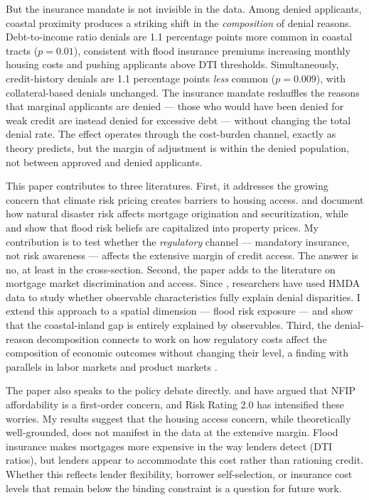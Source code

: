 \documentclass[12pt]{article}
\begin{document}
But the insurance mandate is not invisible in the data. Among denied applicants, coastal proximity produces a striking shift in the \textit{composition} of denial reasons. Debt-to-income ratio denials are 1.1 percentage points more common in coastal tracts ($p = 0.01$), consistent with flood insurance premiums increasing monthly housing costs and pushing applicants above DTI thresholds. Simultaneously, credit-history denials are 1.1 percentage points \textit{less} common ($p = 0.009$), with collateral-based denials unchanged. The insurance mandate reshuffles the reasons that marginal applicants are denied --- those who would have been denied for weak credit are instead denied for excessive debt --- without changing the total denial rate. The effect operates through the cost-burden channel, exactly as theory predicts, but the margin of adjustment is within the denied population, not between approved and denied applicants.

This paper contributes to three literatures. First, it addresses the growing concern that climate risk pricing creates barriers to housing access. \citet{keys2020neglected} and \citet{ouazad2022mortgage} document how natural disaster risk affects mortgage origination and securitization, while \citet{bakkensen2022going} and \citet{baldauf2020does} show that flood risk beliefs are capitalized into property prices. My contribution is to test whether the \textit{regulatory} channel --- mandatory insurance, not risk awareness --- affects the extensive margin of credit access. The answer is no, at least in the cross-section. Second, the paper adds to the literature on mortgage market discrimination and access. Since \citet{munnell1996mortgage}, researchers have used HMDA data to study whether observable characteristics fully explain denial disparities. I extend this approach to a spatial dimension --- flood risk exposure --- and show that the coastal-inland gap is entirely explained by observables. Third, the denial-reason decomposition connects to work on how regulatory costs affect the composition of economic outcomes without changing their level, a finding with parallels in labor markets and product markets \citep{angrist2009mostly}.

The paper also speaks to the policy debate directly. \citet{kousky2018financing} and \citet{kousky2014managing} have argued that NFIP affordability is a first-order concern, and Risk Rating 2.0 has intensified these worries. My results suggest that the housing access concern, while theoretically well-grounded, does not manifest in the data at the extensive margin. Flood insurance makes mortgages more expensive in the way lenders detect (DTI ratios), but lenders appear to accommodate this cost rather than rationing credit. Whether this reflects lender flexibility, borrower self-selection, or insurance cost levels that remain below the binding constraint is a question for future work.
\end{document}
